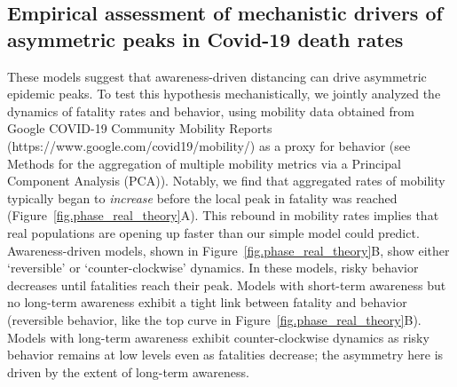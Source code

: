 \subsection{Empirical assessment of mechanistic drivers of asymmetric peaks in Covid-19 death rates}

These models suggest that 
awareness-driven distancing can drive
asymmetric epidemic peaks.
To test this hypothesis mechanistically, we jointly analyzed the dynamics of fatality
rates and behavior, using mobility
data obtained from Google COVID-19 Community Mobility Reports (https://www.google.com/covid19/mobility/)
as a proxy for behavior (see Methods for the
aggregation of multiple mobility metrics via
a Principal Component Analysis (PCA)).
Notably, we find that aggregated rates of mobility 
typically began to \emph{increase} before
the local peak in fatality was reached (Figure~\ref{fig.phase_real_theory}A).  
This rebound in mobility rates
implies that real populations are opening up faster than our simple model could predict.
Awareness-driven models, shown in Figure~\ref{fig.phase_real_theory}B,
show either `reversible' or `counter-clockwise' dynamics. In these models, risky behavior decreases until fatalities reach their peak.
Models with short-term awareness but no long-term awareness exhibit a tight link between fatality and behavior (reversible behavior, like the top curve in  Figure~\ref{fig.phase_real_theory}B). 
Models with long-term awareness exhibit counter-clockwise dynamics
as risky behavior remains at low levels even as fatalities decrease; 
the asymmetry here is driven by the extent of long-term awareness. 

